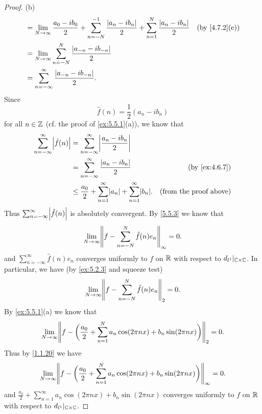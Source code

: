 \begin{proof}{(b)}
\begin{align*}
     & = \lim_{N \to \infty} \frac{a_0 - i b_0}{2} + \sum_{n = -N}^{-1} \frac{\abs{a_n - i b_n}}{2} + \sum_{n = 1}^N \frac{\abs{a_n - i b_n}}{2} & \text{(by \cref{4.7.2}(e))} \\
     & = \lim_{N \to \infty} \sum_{n = -N}^N \frac{\abs{a_{-n} - i b_{-n}}}{2}                                                                                                 \\
     & = \sum_{n = -\infty}^\infty \frac{\abs{a_{-n} - i b_{-n}}}{2}.
  \end{align*}
  Since
  \[
    \hat{f}(n) = \frac{1}{2} (a_n - i b_n)
  \]
  for all \(n \in \mathbb{Z}\) (cf. the proof of \cref{ex:5.5.1}(a)), we know that
  \begin{align*}
    \sum_{n = -\infty}^\infty \abs{\hat{f}(n)} & = \sum_{n = -\infty}^\infty \abs{\frac{a_n - i b_n}{2}}                                                             \\
                                               & = \sum_{n = -\infty}^\infty \frac{\abs{a_n - i b_n}}{2}                             & \text{(by \cref{ex:4.6.7})}   \\
                                               & \leq \frac{a_0}{2} + \sum_{n = 1}^\infty \abs{a_n} + \sum_{n = 1}^\infty \abs{b_n}. & \text{(from the proof above)}
  \end{align*}
  Thus \(\sum_{n = -\infty}^\infty \abs{\hat{f}(n)}\) is absolutely convergent.
  By \cref{5.5.3} we know that
  \[
    \lim_{N \to \infty} \norm*{f - \sum_{n = -N}^N \hat{f}(n) e_n}_{\infty} = 0.
  \]
  and \(\sum_{n = -\infty}^\infty \hat{f}(n) e_n\) converges uniformly to \(f\) on \(\mathbb{R}\) with respect to \(d_{l^1}|_{\mathbb{C} \times \mathbb{C}}\).
  In particular, we have (by \cref{ex:5.2.3} and squeeze test)
  \[
    \lim_{N \to \infty} \norm*{f - \sum_{n = -N}^N \hat{f}(n) e_n}_2 = 0.
  \]
  By \cref{ex:5.5.1}(a) we know that
  \[
    \lim_{N \to \infty} \norm*{f - \bigg(\frac{a_0}{2} + \sum_{n = 1}^N a_n \cos(2 \pi n x) + b_n \sin(2 \pi n x)\bigg)}_2 = 0.
  \]
  Thus by \cref{1.1.20} we have
  \[
    \lim_{N \to \infty} \norm*{f - \bigg(\frac{a_0}{2} + \sum_{n = 1}^N a_n \cos(2 \pi n x) + b_n \sin(2 \pi n x)\bigg)}_{\infty} = 0.
  \]
  and \(\frac{a_0}{2} + \sum_{n = 1}^\infty a_n \cos(2 \pi n x) + b_n \sin(2 \pi n x)\) converges uniformly to \(f\) on \(\mathbb{R}\) with respect to \(d_{l^1}|_{\mathbb{C} \times \mathbb{C}}\).
\end{proof}

